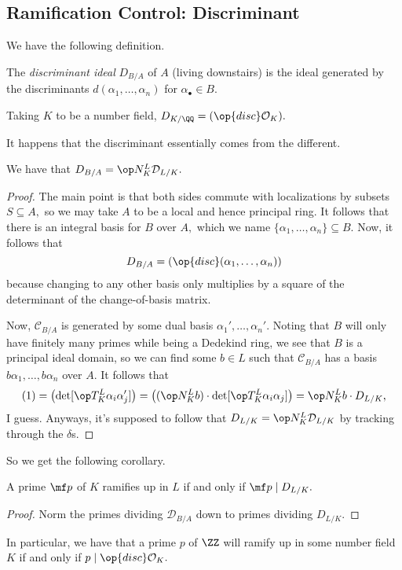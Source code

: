 \subsection{Ramification Control: Discriminant}
We have the following definition.
\begin{definition}
	The \textit{discriminant ideal} $D_{B/A}$ of $A$ (living downstairs) is the ideal generated by the discriminants $d(\alpha_1,\ldots,\alpha_n)$ for $\alpha_\bullet\in B.$
\end{definition}
\begin{example}
	Taking $K$ to be a number field, $D_{K/\QQ}=(\op{disc}\mathcal O_K).$
\end{example}
It happens that the discriminant essentially comes from the different.
\begin{proposition}
	We have that $D_{B/A}=\op N^L_K\mathcal D_{L/K}.$
\end{proposition}
\begin{proof}
	The main point is that both sides commute with localizations by subsets $S\subseteq A,$ so we may take $A$ to be a local and hence principal ring. It follows that there is an integral basis for $B$ over $A,$ which we name $\{\alpha_1,\ldots,\alpha_n\}\subseteq B.$ Now, it follows that
	\[D_{B/A}=(\op{disc}(\alpha_1,\ldots,\alpha_n))\]
	because changing to any other basis only multiplies by a square of the determinant of the change-of-basis matrix.

	Now, $\mathcal C_{B/A}$ is generated by some dual basis $\alpha_1',\ldots,\alpha_n'.$ Noting that $B$ will only have finitely many primes while being a Dedekind ring, we see that $B$ is a principal ideal domain, so we can find some $b\in L$ such that $\mathcal C_{B/A}$ has a basis $b\alpha_1,\ldots,b\alpha_n$ over $A.$\todo{} It follows that
	\[(1)=\left(\det[\op T^L_K\alpha_i\alpha_j']\right)=\left((\op N^L_Kb)\cdot\det[\op T^L_K\alpha_i\alpha_j]\right)=\op N^L_Kb\cdot D_{L/K},\]
	I guess. Anyways, it's supposed to follow that $D_{L/K}=\op N^L_K\mathcal D_{L/K}$ by tracking through the $\delta$s.
\end{proof}
So we get the following corollary.
\begin{proposition}
	A prime $\mf p$ of $K$ ramifies up in $L$ if and only if $\mf p\mid D_{L/K}.$
\end{proposition}
\begin{proof}
	Norm the primes dividing $\mathcal D_{B/A}$ down to primes dividing $D_{L/K}.$
\end{proof}
In particular, we have that a prime $p$ of $\ZZ$ will ramify up in some number field $K$ if and only if $p\mid\op{disc}\mathcal O_K.$

